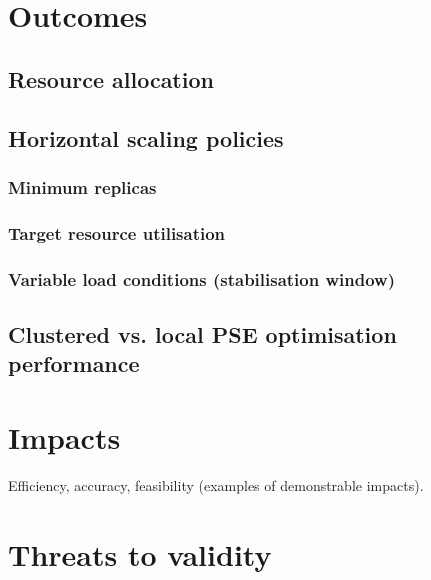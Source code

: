 \section{Outcomes}
\subsection{Resource allocation}
\subsection{Horizontal scaling policies}
\subsubsection{Minimum replicas}
\subsubsection{Target resource utilisation}
\subsubsection{Variable load conditions (stabilisation window)}
\subsection{Clustered vs. local PSE optimisation performance}

\section{Impacts}
Efficiency, accuracy, feasibility (examples of demonstrable impacts).
\section{Threats to validity}